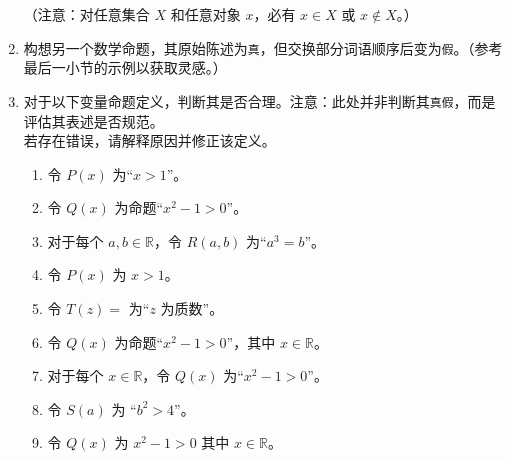 \begin{enumerate}[label=(\arabic*)]
        （注意：对任意集合 $X$ 和任意对象 $x$，必有 $x \in X$ 或 $x \notin X$。）
    \item 构想另一个数学命题，其原始陈述为\verb|真|，但交换部分词语顺序后变为\verb|假|。（参考最后一小节的示例以获取灵感。）
    \item 对于以下变量命题定义，判断其是否合理。注意：此处并非判断其\verb|真|\verb|假|，而是评估其表述是否规范。\\
    若存在错误，请解释原因并修正该定义。
    \begin{enumerate}[label=(\alph*)]
        \item 令 $P(x)$ 为``$x > 1$''。
        \item 令 $Q(x)$ 为命题``$x^2 - 1 > 0$''。
        \item 对于每个 $a,b \in \mathbb{R}$，令 $R(a, b)$ 为``$a^3 = b$''。
        \item 令 $P(x)$ 为 $x > 1$。
        \item 令 $T(z) = $ 为``$z$ 为质数''。
        \item 令 $Q(x)$ 为命题``$x^2 - 1 > 0$''，其中 $x \in \mathbb{R}$。
        \item 对于每个 $x \in \mathbb{R}$，令 $Q(x)$ 为``$x^2 - 1 > 0$''。
        \item 令 $S(a)$ 为 ``$b^2 > 4$''。
        \item 令 $Q(x)$ 为 $x^2 - 1 > 0$ 其中 $x \in \mathbb{R}$。
    \end{enumerate}
\end{enumerate}